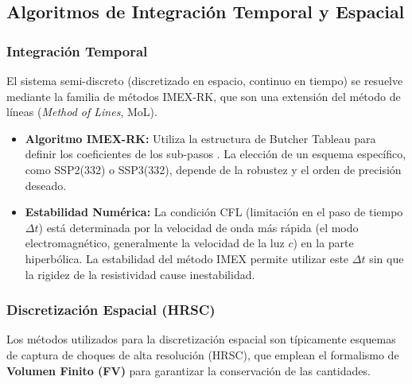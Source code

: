 \subsection{Algoritmos de Integración Temporal y Espacial}

\subsubsection{Integración Temporal}
El sistema semi-discreto (discretizado en espacio, continuo en tiempo) se resuelve mediante la familia de métodos IMEX-RK, que son una extensión del método de líneas (\textit{Method of Lines}, MoL).

\begin{itemize}
    \item \textbf{Algoritmo IMEX-RK:} Utiliza la estructura de Butcher Tableau para definir los coeficientes de los sub-pasos \cite{248, 396}. La elección de un esquema específico, como SSP2(332) o SSP3(332), depende de la robustez y el orden de precisión deseado.
    \item \textbf{Estabilidad Numérica:} La condición CFL (limitación en el paso de tiempo $\Delta t$) está determinada por la velocidad de onda más rápida (el modo electromagnético, generalmente la velocidad de la luz $c$) en la parte hiperbólica. La estabilidad del método IMEX permite utilizar este $\Delta t$ sin que la rigidez de la resistividad cause inestabilidad.
\end{itemize}

\subsubsection{Discretización Espacial (HRSC)}

Los métodos utilizados para la discretización espacial son típicamente esquemas de captura de choques de alta resolución (HRSC), que emplean el formalismo de \textbf{Volumen Finito (FV)} para garantizar la conservación de las cantidades.


